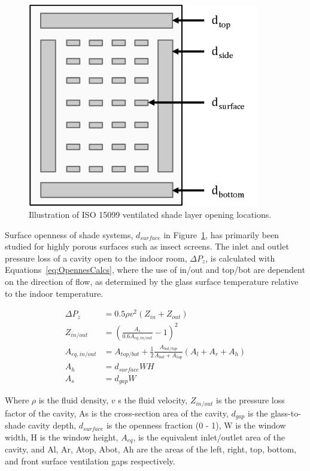 \begin{figure}[hbtp]
	\centering
	\includegraphics[width=0.9\textwidth, height=0.9\textheight, keepaspectratio=true]{media/WindowLayerAirflowOpennings.png}
	\caption{Illustration of ISO 15099 ventilated shade layer opening locations. \protect \label{fig:Openness_ISO15099}}
\end{figure}

Surface openness of shade systems, $d_{surface}$ in Figure~\ref{fig:Openness_ISO15099}, has primarily been studied for highly porous surfaces such as insect screens.
The inlet and outlet pressure loss of a cavity open to the indoor room, $\Delta P_z$, is calculated with Equations~\ref{eq:OpennesCalcs}, where the use of in/out and top/bot are dependent on the direction of flow, as determined by the glass surface temperature relative to the indoor temperature.

\begin{equation}
\begin{array}{rl}
\Delta P_{z}  & = 0.5 \rho v^2(Z_{in}+Z_{out}) \\
Z_{in/out} & = (\frac{A_s}{0.6A_{eq,in/out}}-1)^2 \\
A_{eq,in/out} & = A_{top/bot} + \frac{1}{2} \frac{A_{bot/top}}{A_{bot} + A_{top}}(A_l + A_r + A_h) \\
A_h & = d_{surface}WH \\
A_s & = d_{gap}W
\end{array}
\label{eq:OpennesCalcs}
\end{equation}

Where $\rho$ is the fluid density, $v$ s the fluid velocity, $Z_{in/out}$ is the pressure loss factor of the cavity, As is the cross-section area of the cavity, $d_{gap}$ is the glass-to-shade cavity depth, $d_{surface}$ is the openness fraction (0 - 1), W is the window width, H is the window height, $A_{eq}$, is the equivalent inlet/outlet area of the cavity, and Al, Ar, Atop, Abot, Ah are the areas of the left, right, top, bottom, and front surface ventilation gaps respectively. 

